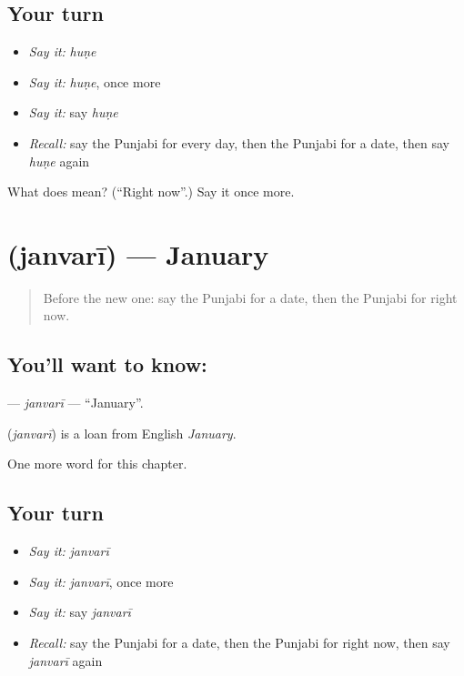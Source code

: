 \subsection*{Your turn}
\begin{itemize}
\raggedright
  \item \emph{Say it:} \emph{huṇe}
  \item \emph{Say it:} \emph{huṇe}, once more
  \item \emph{Say it:} say \emph{huṇe}
  \item \emph{Recall:} say the Punjabi for every day, then the Punjabi for a date, then say \emph{huṇe} again
\end{itemize}

\begin{tcolorbox}[breakable,colback=teal!4,colframe=teal!35!black,title={Before you move on}]
What does  mean? (\textquotedblleft{}Right now\textquotedblright{}.) Say it once more.
\end{tcolorbox}
\section[\texorpdfstring{\pa{ਜਨਵਰੀ} (janvarī)}{ਜਨਵਰੀ (janvarī)}]{ (janvarī) — January}

\label{lesson:PA-C101-janvari}



\begin{quote}
Before the new one: say the Punjabi for a date, then the Punjabi for right now.
\end{quote}

\subsection*{You'll want to know: }
\textbf{} — \emph{janvarī} — \textquotedblleft{}January\textquotedblright{}.

\begin{cousinweb}
\textbf{} (\emph{janvarī}) is a loan from English \emph{January}.
\end{cousinweb}

\begin{grammarlens}[title={What you've built}]
One more word for this chapter.
\end{grammarlens}

\subsection*{Your turn}
\begin{itemize}
\raggedright
  \item \emph{Say it:} \emph{janvarī}
  \item \emph{Say it:} \emph{janvarī}, once more
  \item \emph{Say it:} say \emph{janvarī}
  \item \emph{Recall:} say the Punjabi for a date, then the Punjabi for right now, then say \emph{janvarī} again
\end{itemize}

